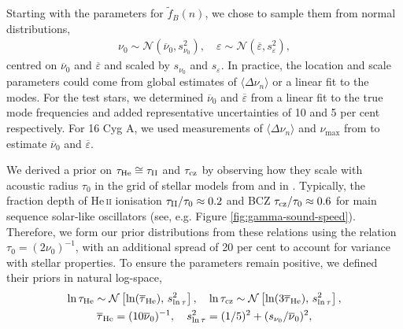 Starting with the parameters for \(\tilde{f}_B(n)\), we chose to sample them from normal distributions,
%
\begin{gather*}
    \nu_0 \sim \mathcal{N}(\overline{\nu}_0, s_{\nu_0}^2), \quad \varepsilon \sim \mathcal{N}(\overline{\varepsilon}, s_\varepsilon^2),%
\end{gather*}
%
centred on \(\overline{\nu}_0\) and \(\overline{\varepsilon}\) and scaled by \(s_{\nu_0}\) and \(s_\varepsilon\). In practice, the location and scale parameters could come from global estimates of \(\langle\Delta\nu_n\rangle\) or a linear fit to the modes. For the test stars, we determined \(\overline{\nu}_0\) and \(\overline{\varepsilon}\) from a linear fit to the true mode frequencies and added representative uncertainties of 10 and 5 per cent respectively. For 16 Cyg A, we used measurements of \(\langle\Delta\nu_n\rangle\) and \(\nu_{\max}\) from \citet{Lund.SilvaAguirre.ea2017} to estimate \(\overline{\nu}_0\) and \(\overline{\varepsilon}\).


We derived a prior on \(\tau_{{\mathrm{He}}} \cong \tau_{{\mathrm{II}}}\) and \(\tau_{{\mathrm{cz}}}\) by observing how they scale with acoustic radius \(\tau_0\) in the grid of stellar models from \citet{Lyttle.Davies.ea2021} and in \citet{Verma.Rorsted.ea2022}. Typically, the fraction depth of He\,\textsc{ii} ionisation \(\tau_{{\mathrm{II}}}/\tau_0 \approx 0.2\) and BCZ \(\tau_{{\mathrm{cz}}}/\tau_0 \approx 0.6\) for main sequence solar-like oscillators (see, e.g. Figure \ref{fig:gamma-sound-speed}). Therefore, we form our prior distributions from these relations using the relation \({\tau}_0 = (2\nu_0)^{-1}\), with an additional spread of 20 per cent to account for variance with stellar properties. To ensure the parameters remain positive, we defined their priors in natural log-space,
%
\begin{gather*}
    \ln\tau_{{\mathrm{He}}} \sim \mathcal{N}\left[ \ln(\overline{\tau}_{{\mathrm{He}}}), \, s_{\ln\tau}^2 \right], \quad \ln\tau_{{\mathrm{cz}}} \sim \mathcal{N}\left[\ln(3\overline{\tau}_{{\mathrm{He}}}), \, s_{\ln\tau}^2 \right],\\
    \overline{\tau}_{{\mathrm{He}}} = (10 \overline{\nu}_0)^{-1}, \quad s_{\ln\tau}^2 = (1/5)^2 + (s_{\nu_0}/\overline{\nu}_0)^2,
\end{gather*}

